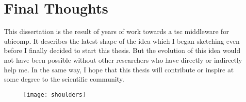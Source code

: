 \section{Final Thoughts}


This dissertation is the result of years of work towards a \acl{tsc} middleware for \acl{ubicomp}.
It describes the latest shape of the idea which I began sketching even before I finally decided to start this thesis.
But the evolution of this idea would not have been possible without other researchers who have directly or indirectly help me. %
In the same way, I hope that this thesis will contribute or inspire at some degree to the scientific community.


\begin{figure}[p]
    \centering
    \texttt{[image: shoulders]}
    \caption*{}{ }
    \label{fig:shouldersOfGiants}
\end{figure}